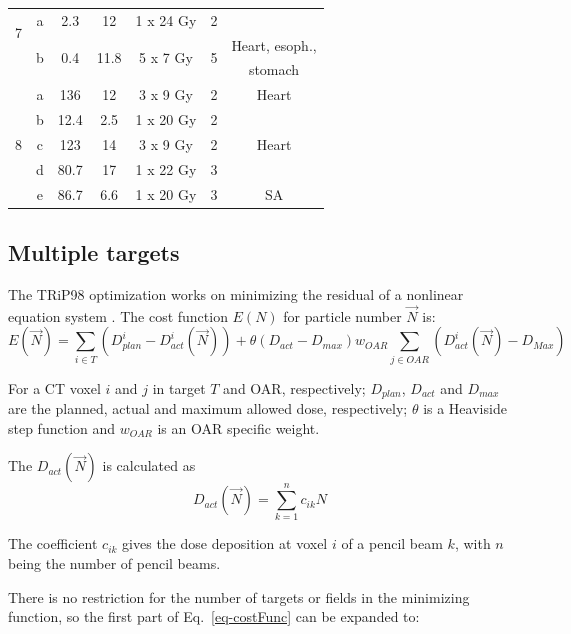 \documentclass[type=dr, dr=rernat, accentcolor=tud7b,colorbacktitle, bigchapter, openright, twoside, 12pt ]{tudthesis}
\begin{document}
\begin{table}[H]
\begin{tabular}{c|c|c|c|c|c|c}
		 \hline
		 \multirow{2}{*}{7} & a & 2.3 & 12  & 1 x 24 Gy & 2 &\\
		 & \multirow{2}{*}{b} & \multirow{2}{*}{0.4} & \multirow{2}{*}{11.8}  & \multirow{2}{*}{5 x 7 Gy} & \multirow{2}{*}{5} & Heart, esoph., \\
		 & & & & & & stomach \\
		 \hline
		 \multirow{5}{*}{8} & a & 136 & 12  & 3 x 9 Gy & 2 & Heart\\
		  & b & 12.4 & 2.5  & 1 x 20 Gy & 2 &\\
		  & c & 123 & 14  & 3 x 9 Gy & 2  &Heart \\
		 & d & 80.7 & 17  & 1 x 22 Gy & 3  &\\
		 & e & 86.7 & 6.6  & 1 x 20 Gy & 3 & SA \\
		\hline\hline
	\end{tabular}
	\label{tab:patdata2}
\end{table}


\newpage

\subsection{Multiple targets}

The TRiP98 optimization works on minimizing the residual of a nonlinear equation system \cite{Kraemer2000a}. The cost function $E(N)$ for particle number $\vec{N}$ is:
\begin{equation}
\label{eq-costFunc}
 E(\vec{N}) = \sum_{i\in T} \left( D_{plan}^{i} - D_{act}^{i}(\vec{N})\right) +  \theta(D_{act}-D_{max})w_{OAR}\sum_{j\in OAR} \left( D_{act}^{i}(\vec{N}) - D_{Max} \right)
\end{equation}

For a CT voxel $i$ and $j$ in target $T$ and OAR, respectively; $ D_{plan}$, $D_{act}$ and $D_{max}$ are the planned, actual and maximum allowed dose, respectively; $\theta$ is a 
Heaviside step function and $w_{OAR}$ is an OAR specific weight.

The $D_{act}(\vec{N})$ is calculated as
\begin{equation}
 D_{act}(\vec{N}) = \sum_{k=1}^n c_{ik}N
\end{equation}

The coefficient $c_{ik}$ gives the dose deposition at voxel $i$ of a pencil beam $k$, 
with $n$ being the number of pencil beams. 

There is no restriction for the number of targets or fields in the minimizing function, so the first part of Eq.~\ref{eq-costFunc} can be expanded to:
\end{document}
